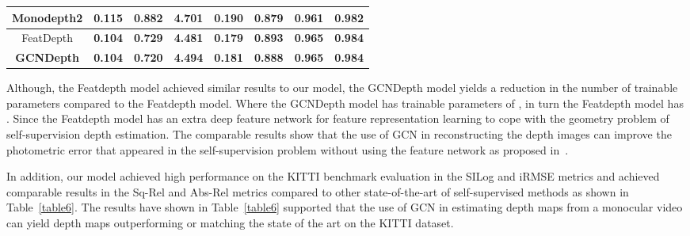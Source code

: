 \documentclass[journal]{IEEEtran}
\begin{document}
\begin{table*}[t]
\begin{tabular}{|c|cccc|ccc|}
Monodepth2\cite{Godard2018} & {\color[HTML]{FE0000} \textbf{0.115}} & 0.882 & 4.701 & 0.190 & 0.879 & {\color[HTML]{FE0000} \textbf{0.961}} & {\color[HTML]{FE0000} \textbf{0.982}} \\ \hline
FeatDepth\cite{Shu2020} & {\color[HTML]{3166FF} \textbf{0.104}} & {\color[HTML]{FE0000} \textbf{0.729}} & {\color[HTML]{3166FF} \textbf{4.481}} & {\color[HTML]{3166FF} \textbf{0.179}} & {\color[HTML]{3166FF} \textbf{0.893}} & {\color[HTML]{3166FF} \textbf{0.965}} & {\color[HTML]{3166FF} \textbf{0.984}} \\ \hline
\textbf{GCNDepth} & {\color[HTML]{3166FF} \textbf{0.104}} & {\color[HTML]{3166FF} \textbf{0.720}} & {\color[HTML]{FE0000} \textbf{4.494}} & {\color[HTML]{FE0000} \textbf{0.181}} & {\color[HTML]{FE0000} \textbf{0.888}} & {\color[HTML]{3166FF} \textbf{0.965}} & {\color[HTML]{3166FF} \textbf{0.984}} \\ \hline
\end{tabular}
\label{table5}
\end{table*}



Although, the Featdepth model achieved similar results to our model, the GCNDepth model yields a  reduction in the number of trainable parameters compared to the Featdepth model. Where  the GCNDepth model has trainable parameters of , in turn the Featdepth model has . Since the Featdepth model has an extra deep feature network for feature representation learning to cope with the geometry problem of self-supervision depth estimation. The comparable results show that the use of GCN in reconstructing the depth images can improve the photometric error that appeared in the self-supervision problem without using the feature network as proposed in~\cite{Shu2020}. 

In addition, our model achieved high performance on the KITTI benchmark evaluation in the SILog and iRMSE metrics and achieved comparable results in the Sq-Rel and Abs-Rel metrics compared to other state-of-the-art of self-supervised methods as shown in Table~\ref{table6}. The results have shown in  Table~\ref{table6} supported that the use of GCN in estimating depth maps from a monocular video can yield depth maps outperforming or matching the state of the art on the KITTI dataset.
\end{document}
